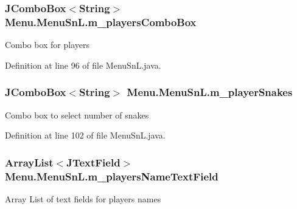 \hypertarget{class_menu_1_1_menu_sn_l_a52b5fdac24b1860a453eee6f505208da}{}
\subsubsection[{m\+\_\+players\+Combo\+Box}]{\setlength{\rightskip}{0pt plus 5cm}J\+Combo\+Box$<$String$>$ Menu.\+Menu\+Sn\+L.\+m\+\_\+players\+Combo\+Box\hspace{0.3cm}{\ttfamily [private]}}\label{class_menu_1_1_menu_sn_l_a52b5fdac24b1860a453eee6f505208da}
Combo box for players 

Definition at line 96 of file Menu\+Sn\+L.\+java.

\hypertarget{class_menu_1_1_menu_sn_l_acc735c8e538c308d888618f726ddd344}{}
\subsubsection[{m\+\_\+player\+Snakes}]{\setlength{\rightskip}{0pt plus 5cm}J\+Combo\+Box$<$String$>$ Menu.\+Menu\+Sn\+L.\+m\+\_\+player\+Snakes\hspace{0.3cm}{\ttfamily [private]}}\label{class_menu_1_1_menu_sn_l_acc735c8e538c308d888618f726ddd344}
Combo box to select number of snakes 

Definition at line 102 of file Menu\+Sn\+L.\+java.

\hypertarget{class_menu_1_1_menu_sn_l_a8e5b5896ffe07afef10443fe99b45dab}{}
\subsubsection[{m\+\_\+players\+Name\+Text\+Field}]{\setlength{\rightskip}{0pt plus 5cm}Array\+List$<$J\+Text\+Field$>$ Menu.\+Menu\+Sn\+L.\+m\+\_\+players\+Name\+Text\+Field\hspace{0.3cm}{\ttfamily [private]}}\label{class_menu_1_1_menu_sn_l_a8e5b5896ffe07afef10443fe99b45dab}
Array List of text fields for player\textquotesingle{}s names 

